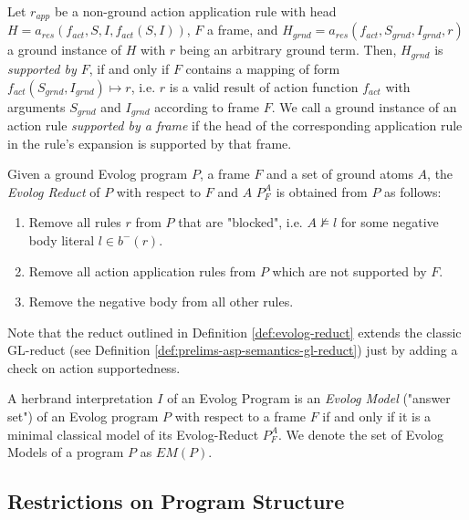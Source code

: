 \begin{definition}
\label{def:evolog-supported-action}
Let $r_{app}$ be a non-ground action application rule with head $H = a_{res}(f_{act}, S, I, f_{act}(S, I))$, $F$ a frame, and $H_{grnd} = a_{res}(f_{act}, S_{grnd}, I_{grnd}, r)$ a ground instance of $H$ with $r$ being an arbitrary ground term.
Then, $H_{grnd}$ is \emph{supported by $F$}, if and only if $F$ contains a mapping of form $f_{act}(S_{grnd}, I_{grnd}) \mapsto r$, i.e. $r$ is a valid result of action function $f_{act}$ with arguments $S_{grnd}$ and $I_{grnd}$ according to frame $F$. 
We call a ground instance of an action rule \emph{supported by a frame} if the head of the corresponding application rule in the rule's expansion is supported by that frame.
\end{definition}

\begin{definition}
\label{def:evolog-reduct}
Given a ground Evolog program $P$, a frame $F$ and a set of ground atoms $A$, the \emph{Evolog Reduct} of $P$ with respect to $F$ and $A$ $P_{F}^{A}$ is obtained from $P$ as follows:
\begin{enumerate}
	\item Remove all rules $r$ from $P$ that are "blocked", i.e. $A \not\models l$ for some negative body literal $l \in b^{-}(r)$.
	\item Remove all action application rules from $P$ which are not supported by $F$.
	\item Remove the negative body from all other rules.
\end{enumerate}
\end{definition}

Note that the reduct outlined in Definition \ref{def:evolog-reduct} extends the classic GL-reduct (see Definition \ref{def:prelims-asp-semantics-gl-reduct}) just by adding a check on action supportedness.

\begin{definition}
A herbrand interpretation $I$ of an Evolog Program is an \emph{Evolog Model} ("answer set") of an Evolog program $P$ with respect to a frame $F$ if and only if it is a minimal classical model of its Evolog-Reduct $P_{F}^{A}$. We denote the set of Evolog Models of a program $P$ as $\mathit{EM}(P)$.
\end{definition}

\subsection{Restrictions on Program Structure}
\label{subsec:evolog-actions-restrictions}

